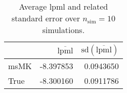 \begin{table}[H]

\caption{Average lpml and related standard error over $n_{\text{sim}} = 10$ simulations.}
\centering
\begin{tabular}[t]{lrr}
\toprule
  & $\overbar{\text{lpml}}$ & $\text{sd}(\overbar{\text{lpml}})$\\
\midrule
msMK & -8.397853 & 0.0943650\\
True & -8.300160 & 0.0911786\\
\bottomrule
\end{tabular}
\end{table}